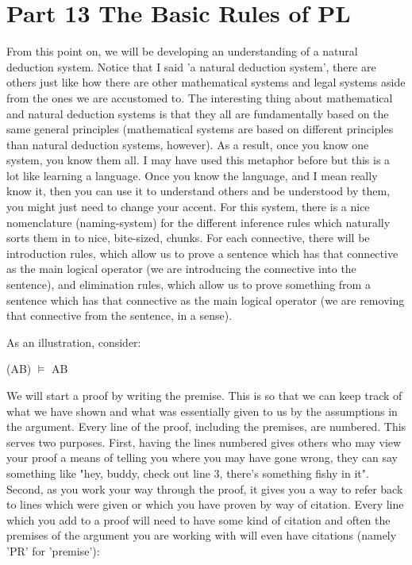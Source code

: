\chapter{Part 13 The Basic Rules of PL}
From this point on, we will be developing an understanding of a natural deduction system. Notice that I said 'a natural deduction system', there are others just like how there are other mathematical systems and legal systems aside from the ones we are accustomed to. The interesting thing about mathematical and natural deduction systems is that they all are fundamentally based on the same general principles (mathematical systems are based on different principles than natural deduction systems, however). As a result, once you know one system, you know them all. I may have used this metaphor before but this is a lot like learning a language. Once you know the language, and I mean really know it, then you can use it to understand others and be understood by them, you might just need to change your accent. For this system, there is a nice nomenclature (naming-system) for the different inference rules which naturally sorts them in to nice, bite-sized, chunks. For each connective, there will be introduction rules, which allow us to prove a sentence which has that connective as the main logical operator (we are introducing the connective into the sentence), and elimination rules, which allow us to prove something from a sentence which has that connective as the main logical operator (we are removing that connective from the sentence, in a sense).

As an illustration, consider:
\begin{center}
\enot (A\eor B) $\vDash$ \enot A\eand  \enot B
\end{center}
We will start a proof by writing the premise. This is so that we can keep track of what we have shown and what was essentially given to us by the assumptions in the argument. Every line of the proof, including the premises, are numbered. This serves two purposes. First, having the lines numbered gives others who may view your proof a means of telling you where you may have gone wrong, they can say something like "hey, buddy, check out line 3, there's something fishy in it". Second, as you work your way through the proof, it gives you a way to refer back to lines which were given or which you have proven by way of citation. Every line which you add to a proof will need to have some kind of citation and often the premises of the argument you are working with will even have citations (namely 'PR' for 'premise'):

